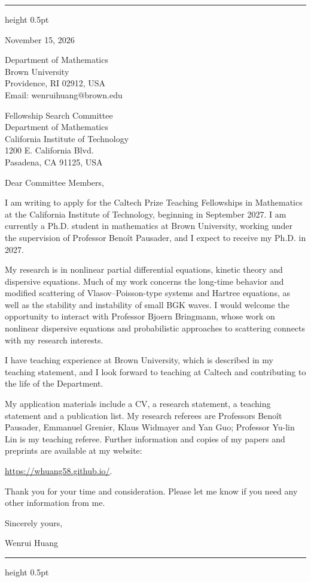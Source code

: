 \documentclass[10pt]{article}
\begin{document}
\vspace{0.08in}
\hrule height 0.5pt

\vspace{0.47in}
\hfill
\begin{minipage}{2.27in}
November 15, 2026

\vspace{0.16in}
Department of Mathematics\\
Brown University\\
Providence, RI 02912, USA\\
Email: wenrui\textunderscore huang@brown.edu
\end{minipage}

\vspace{0.30in}
Fellowship Search Committee\\
Department of Mathematics\\
California Institute of Technology\\
1200 E. California Blvd.\\
Pasadena, CA 91125, USA

\vspace{0.16in}
Dear Committee Members,

I am writing to apply for the Caltech Prize Teaching Fellowships in Mathematics at the California Institute of Technology, beginning in September 2027. I am currently a Ph.D. student in mathematics at Brown University, working under the supervision of Professor Beno\^{i}t Pausader, and I expect to receive my Ph.D. in 2027.

My research is in nonlinear partial differential equations, kinetic theory and dispersive equations. Much of my work concerns the long-time behavior and modified scattering of Vlasov--Poisson-type systems and Hartree equations, as well as the stability and instability of small BGK waves. I would welcome the opportunity to interact with Professor Bjoern Bringmann, whose work on nonlinear dispersive equations and probabilistic approaches to scattering connects with my research interests.

I have teaching experience at Brown University, which is described in my teaching statement, and I look forward to teaching at Caltech and contributing to the life of the Department.

My application materials include a CV, a research statement, a teaching statement and a publication list. My research referees are Professors Beno\^{i}t Pausader, Emmanuel Grenier, Klaus Widmayer and Yan Guo; Professor Yu-lin Lin is my teaching referee. Further information and copies of my papers and preprints are available at my website:

\url{https://whuang58.github.io/}.

\medskip
Thank you for your time and consideration. Please let me know if you need any other information from me.

\vspace{0.12in}
Sincerely yours,

\vspace{0.12in}
Wenrui Huang

\vfill
\hrule height 0.5pt
\end{document}
